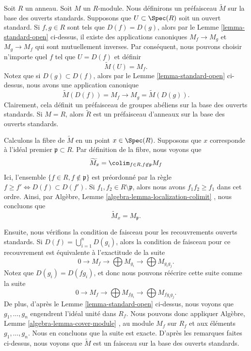 \noindent
Soit  $R$  un anneau. Soit  $M$  un  $R$-module. Nous
définirons un préfaisceau  $\widetilde M$  sur la base des ouverts standards.
Supposons que  $U \subset \Spec(R)$  soit un ouvert standard. Si  $f, g \in R$  sont tels que
 $D(f) = D(g)$, alors par le Lemme  \ref{lemma-standard-open}  ci-dessus, il existe des
applications canoniques  $M_f \to M_g$  et  $M_g \to M_f$  qui sont mutuellement
inverses. Par conséquent, nous pouvons choisir n'importe quel  $f$  tel que
 $U = D(f)$  et définir
$$
\widetilde M(U) = M_f.
$$
Notez que si  $D(g) \subset D(f)$, alors par le Lemme  \ref{lemma-standard-open}  ci-dessus, nous avons
une application canonique
$$
\widetilde M(D(f)) = M_f \longrightarrow M_g = \widetilde M(D(g)).
$$
Clairement, cela définit un préfaisceau de groupes abéliens sur la base des
ouverts standards. Si  $M = R$, alors  $\widetilde R$  est un préfaisceau
d'anneaux sur la base des ouverts standards.

\medskip\noindent
Calculons la fibre de  $\widetilde M$  en un point  $x \in \Spec(R)$. Supposons que
 $x$  corresponde à l'idéal premier  $\mathfrak p \subset R$. Par définition de la fibre, nous
voyons que
$$
\widetilde M_x = \colim_{f\in R, f\not\in \mathfrak p} M_f
$$
Ici, l'ensemble  $\{f \in R, f \not \in \mathfrak p\}$  est préordonné par la règle  $f \geq f' \Leftrightarrow D(f) \subset D(f')$. Si
 $f_1, f_2 \in R \setminus \mathfrak p$, alors nous avons  $f_1f_2 \geq f_1$  dans cet ordre. Ainsi, par Algèbre,
Lemme  \ref{algebra-lemma-localization-colimit} , nous concluons que
$$
\widetilde M_x = M_{\mathfrak p}.
$$

\medskip\noindent
Ensuite, nous vérifions la condition de faisceau pour les recouvrements ouverts
standards. Si  $D(f) = \bigcup_{i = 1}^n D(g_i)$, alors la condition de faisceau pour ce recouvrement
est équivalente à l’exactitude de la suite
$$
0 \to M_f \to \bigoplus M_{g_i} \to \bigoplus M_{g_ig_j}.
$$
Notez que  $D(g_i) = D(fg_i)$, et donc nous pouvons réécrire cette suite comme la suite
$$
0 \to M_f \to \bigoplus M_{fg_i} \to \bigoplus M_{fg_ig_j}.
$$
De plus, d'après le Lemme  \ref{lemma-standard-open}  ci-dessus, nous voyons que  $g_1, \ldots, g_n$ 
engendrent l'idéal unité dans  $R_f$. Nous pouvons donc appliquer Algèbre, Lemme
 \ref{algebra-lemma-cover-module} , au module  $M_f$  sur  $R_f$  et aux éléments
 $g_1, \ldots, g_n$. Nous en concluons que la suite est exacte. D'après les remarques
faites ci-dessus, nous voyons que  $\widetilde M$  est un faisceau sur la base des
ouverts standards.

